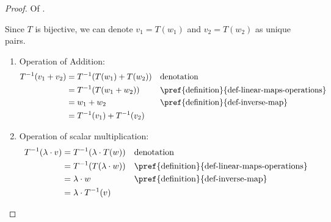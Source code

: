 \begin{proof}
	Of .
	\begin{flushleft}
		Since $T$ is bijective, we can denote $v_1=T(w_1)$ and $v_2=T(w_2)$ as
		unique pairs.
		\begin{enumerate}
			\item Operation of Addition:
			      \begin{align*}
				      T^{-1}(v_1 + v_2) & = T^{-1}(T(w_1) + T(w_2))   &  & \text{denotation}                                    \\
				                        & = T^{-1}(T(w_1 + w_2))      &  & \text{\pref{definition}{def-linear-maps-operations}} \\
				                        & = w_1 + w_2                 &  & \text{\pref{definition}{def-inverse-map}}            \\
				                        & = T^{-1}(v_1) + T^{-1}(v_2)
			      \end{align*}
			\item Operation of scalar multiplication:
			      \begin{align*}
				      T^{-1}(\lambda \cdot v) & = T^{-1}(\lambda \cdot T(w)) &  & \text{denotation}                                    \\
				                              & = T^{-1}(T(\lambda \cdot w)) &  & \text{\pref{definition}{def-linear-maps-operations}} \\
				                              & = \lambda \cdot w            &  & \text{\pref{definition}{def-inverse-map}}            \\
				                              & = \lambda \cdot T^{-1}(v)
			      \end{align*}
		\end{enumerate}
	\end{flushleft}
\end{proof}

